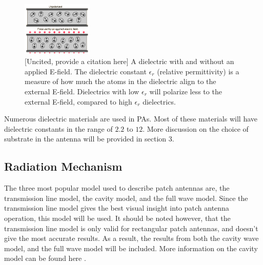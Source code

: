 \documentclass[12pt]{article}
\begin{document}
\begin{figure}[h]
    \centering
    \includegraphics[width=0.3\textwidth]{dielectric.png}
    \caption{ [Uncited, provide a citation here] A dielectric with and without an applied E-field. The dielectric constant $\epsilon_r$ (relative permittivity) is a measure of how much the atoms in the dielectric align to the external E-field. Dielectrics with low $\epsilon_r$ will polarize less to the external E-field, compared to high $\epsilon_r$ dielectrics.}
\end{figure}

Numerous dielectric materials are used in PAs. Most of these materials will have dielectric constants in the range of $2.2$ to $12$\cite{balanis2016antenna}. More discussion on the choice of substrate in the antenna will be provided in section 3. 
\subsection{Radiation Mechanism}
The three most popular model used to describe patch antennas are, the transmission line model, the cavity model, and the full wave model\cite{balanis2016antenna}. Since the transmission line model gives the best visual insight\cite{balanis2016antenna} into patch antenna operation, this model will be used. It should be noted however, that the transmission line model is only valid for rectangular patch antennas, and doesn't give the most accurate results\cite{balanis2016antenna}. As a result, the results from both the cavity wave model, and the full wave model will be included. More information on the cavity model can be found here \cite{balanis2016antenna}.  
\end{document}
